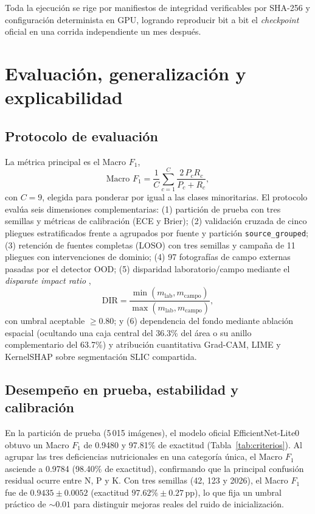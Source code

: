 \documentclass[conference,letterpaper]{IEEEtran}
\newcommand{\Fone}{$F_1$}
\begin{document}
Toda la ejecución se rige por manifiestos de integridad verificables por SHA-256 y configuración determinista en GPU, logrando reproducir bit a bit el \textit{checkpoint} oficial en una corrida independiente un mes después.

\section{Evaluación, generalización y explicabilidad}\label{sec:evaluacion}

\subsection{Protocolo de evaluación}
La métrica principal es el Macro \Fone{},
\begin{equation}
\text{Macro }F_1=\frac{1}{C}\sum_{c=1}^{C}\frac{2\,P_c R_c}{P_c+R_c},
\label{eq:macrof1}
\end{equation}
con $C=9$, elegida para ponderar por igual a las clases minoritarias. El protocolo evalúa seis dimensiones complementarias: (1) partición de prueba con tres semillas y métricas de calibración (ECE y Brier); (2) validación cruzada de cinco pliegues estratificados frente a agrupados por fuente y partición \texttt{source\_grouped}; (3) retención de fuentes completas (LOSO) con tres semillas y campaña de 11 pliegues con intervenciones de dominio; (4) 97 fotografías de campo externas pasadas por el detector OOD; (5) disparidad laboratorio/campo mediante el \textit{disparate impact ratio} \cite{feldman2015},
\begin{equation}
\text{DIR}=\frac{\min(m_{\text{lab}},m_{\text{campo}})}{\max(m_{\text{lab}},m_{\text{campo}})},
\label{eq:dir}
\end{equation}
con umbral aceptable $\ge0.80$; y (6) dependencia del fondo mediante ablación espacial (ocultando una caja central del 36.3\% del área o su anillo complementario del 63.7\%) y atribución cuantitativa Grad-CAM, LIME y KernelSHAP \cite{lundberg2017} sobre segmentación SLIC compartida.

\subsection{Desempeño en prueba, estabilidad y calibración}
En la partición de prueba (5\,015 imágenes), el modelo oficial EfficientNet-Lite0 obtuvo un Macro \Fone{} de 0.9480 y 97.81\% de exactitud (Tabla~\ref{tab:criterios}). Al agrupar las tres deficiencias nutricionales en una categoría única, el Macro \Fone{} asciende a 0.9784 (98.40\% de exactitud), confirmando que la principal confusión residual ocurre entre N, P y K. Con tres semillas (42, 123 y 2026), el Macro \Fone{} fue de $0.9435\pm0.0052$ (exactitud $97.62\%\pm0.27$\,pp), lo que fija un umbral práctico de ${\sim}0.01$ para distinguir mejoras reales del ruido de inicialización.
\end{document}
